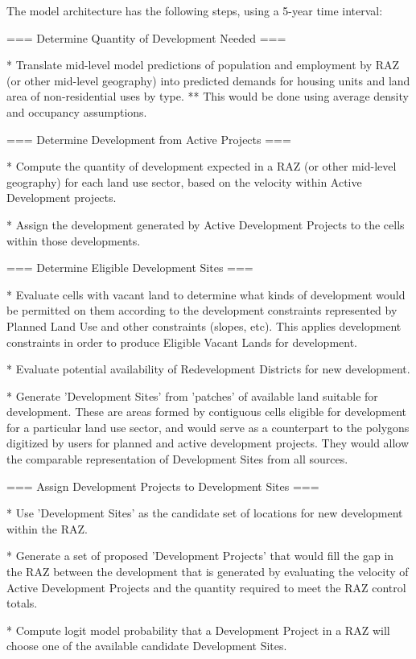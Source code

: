 The model architecture has the following steps, using a 5-year time interval:

=== Determine Quantity of Development Needed ===

* Translate mid-level model predictions of population and employment by RAZ (or other mid-level geography) into predicted demands for housing units and land area of non-residential uses by type.
** This would be done using average density and occupancy assumptions.

=== Determine Development from Active Projects ===

* Compute the quantity of development expected in a RAZ (or other mid-level geography) for each land use sector, based on the velocity within Active Development projects.

* Assign the development generated by Active Development Projects to the cells within those developments.  

=== Determine Eligible Development Sites ===

* Evaluate cells with vacant land to determine what kinds of development would be permitted on them according to the development constraints represented by Planned Land Use and other constraints (slopes, etc).  This applies development constraints in order to produce Eligible Vacant Lands for development.

* Evaluate potential availability of Redevelopment Districts for new development.

* Generate 'Development Sites' from 'patches' of available land suitable for development.  These are areas formed by contiguous cells eligible for development for a particular land use sector, and would serve as a counterpart to the polygons digitized by users for planned and active development projects.  They would allow the comparable representation of Development Sites from all sources.

=== Assign Development Projects to Development Sites ===

* Use 'Development Sites' as the candidate set of locations for new development within the RAZ.

* Generate a set of proposed 'Development Projects' that would fill the gap in the RAZ between the development that is generated by evaluating the velocity of Active Development Projects and the quantity required to meet the RAZ control totals.

* Compute logit model probability that a Development Project in a RAZ will choose one of the available candidate Development Sites.

